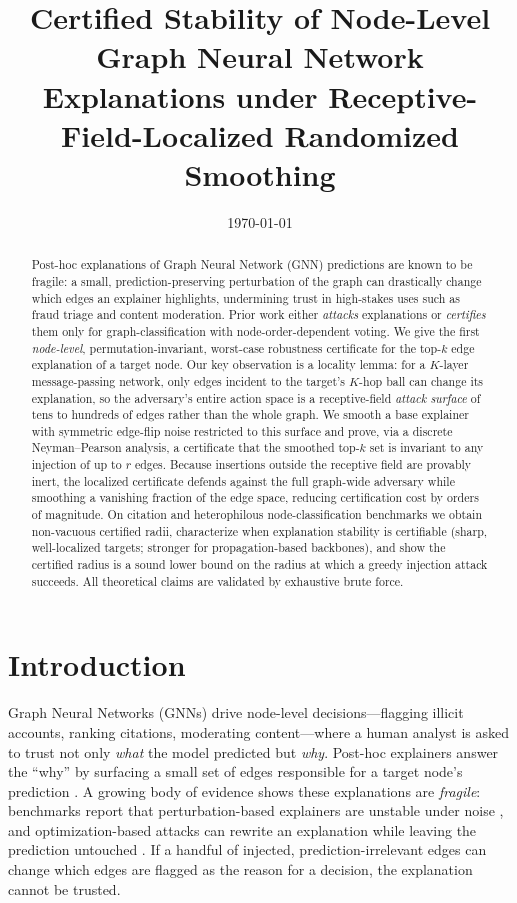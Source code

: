 \documentclass[11pt]{article}
\title{\textbf{Certified Stability of Node-Level Graph Neural Network Explanations
under Receptive-Field-Localized Randomized Smoothing}}
\date{\today}
\begin{document}
\maketitle

\begin{abstract}
Post-hoc explanations of Graph Neural Network (GNN) predictions are known to be
fragile: a small, prediction-preserving perturbation of the graph can drastically
change which edges an explainer highlights, undermining trust in high-stakes uses
such as fraud triage and content moderation. Prior work either \emph{attacks}
explanations or \emph{certifies} them only for graph-classification with
node-order-dependent voting. We give the first \emph{node-level},
permutation-invariant, worst-case robustness certificate for the top-$k$ edge
explanation of a target node. Our key observation is a locality lemma: for a
$K$-layer message-passing network, only edges incident to the target's $K$-hop
ball can change its explanation, so the adversary's entire action space is a
receptive-field \emph{attack surface} of tens to hundreds of edges rather than
the whole graph. We smooth a base explainer with symmetric edge-flip noise
restricted to this surface and prove, via a discrete Neyman--Pearson analysis, a
certificate that the smoothed top-$k$ set is invariant to any injection of up to
$r$ edges. Because insertions outside the receptive field are provably inert, the
localized certificate defends against the full graph-wide adversary while
smoothing a vanishing fraction of the edge space, reducing certification cost by
orders of magnitude. On citation and heterophilous node-classification benchmarks
we obtain non-vacuous certified radii, characterize when explanation stability is
certifiable (sharp, well-localized targets; stronger for propagation-based
backbones), and show the certified radius is a sound lower bound on the radius at
which a greedy injection attack succeeds. All theoretical claims are validated by
exhaustive brute force.
\end{abstract}

\section{Introduction}
Graph Neural Networks (GNNs) drive node-level decisions---flagging illicit
accounts, ranking citations, moderating content---where a human analyst is asked
to trust not only \emph{what} the model predicted but \emph{why}. Post-hoc
explainers answer the ``why'' by surfacing a small set of edges responsible for a
target node's prediction \citep{ying2019gnnexplainer,luo2020pgexplainer,yuan2021subgraphx}.
A growing body of evidence shows these explanations are \emph{fragile}: benchmarks
report that perturbation-based explainers are unstable under noise
\citep{agarwal2023gnnxbench}, and optimization-based attacks can rewrite an
explanation while leaving the prediction untouched \citep{li2024gxattack}. If a
handful of injected, prediction-irrelevant edges can change which edges are
flagged as the reason for a decision, the explanation cannot be trusted.
\end{document}
